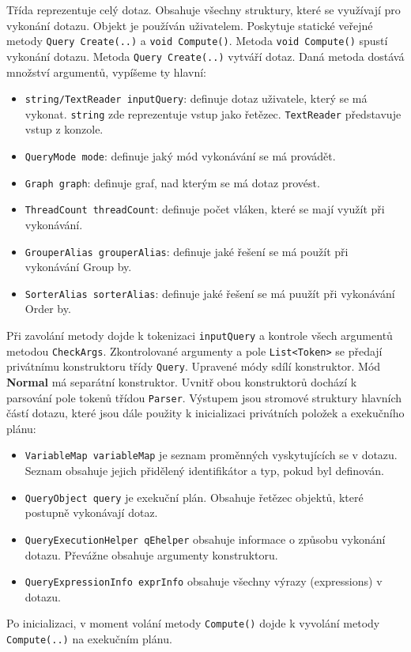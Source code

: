 Třída reprezentuje celý dotaz.
Obsahuje všechny struktury, které se využívají pro vykonání dotazu.
Objekt je používán uživatelem.
Poskytuje statické veřejné metody \texttt{Query Create(..)} a \texttt{void Compute()}.
Metoda \texttt{void Compute()} spustí vykonání dotazu.
Metoda \texttt{Query Create(..)} vytváří dotaz.
Daná metoda dostává množství argumentů, vypíšeme ty hlavní:
\begin{itemize}
\item \texttt{string/TextReader inputQuery}: definuje dotaz uživatele, který se má vykonat. \texttt{string} zde reprezentuje vstup jako řetězec. \texttt{TextReader} představuje vstup z konzole.
\item \texttt{QueryMode mode}: definuje jaký mód vykonávání se má provádět.
\item \texttt{Graph graph}: definuje graf, nad kterým se má dotaz provést.
\item \texttt{ThreadCount threadCount}: definuje počet vláken, které se mají využít při vykonávání.
\item \texttt{GrouperAlias grouperAlias}: definuje jaké řešení se má použít při vykonávání Group by.
\item \texttt{SorterAlias sorterAlias}: definuje jaké řešení se má puužít při vykonávání Order by.
\end{itemize}
Při zavolání metody dojde k tokenizaci \texttt{inputQuery} a kontrole všech argumentů metodou \texttt{CheckArgs}.
Zkontrolované argumenty a pole \texttt{List<Token>} se předají privátnímu konstruktoru třídy \texttt{Query}.
Upravené módy sdílí konstruktor. Mód \textbf{Normal} má separátní konstruktor.
Uvnitř obou konstruktorů dochází k parsování pole tokenů třídou \texttt{Parser}.
Výstupem jsou stromové struktury hlavních částí dotazu, které jsou dále použity k inicializaci privátních položek a exekučního plánu:
\begin{itemize}
\item \texttt{VariableMap variableMap} je seznam proměnných vyskytujících se v dotazu. Seznam obsahuje jejich přidělený identifikátor a typ, pokud byl definován.
\item \texttt{QueryObject query} je exekuční plán. Obsahuje řetězec objektů, které postupně vykonávají dotaz.
\item \texttt{QueryExecutionHelper qEhelper} obsahuje informace o způsobu vykonání dotazu. Převážne obsahuje argumenty konstruktoru. 
\item \texttt{QueryExpressionInfo exprInfo} obsahuje všechny výrazy (expressions) v dotazu.
\end{itemize}
Po inicializaci, v moment volání metody \texttt{Compute()} dojde k vyvolání metody \texttt{Compute(..)} na exekučním plánu.

